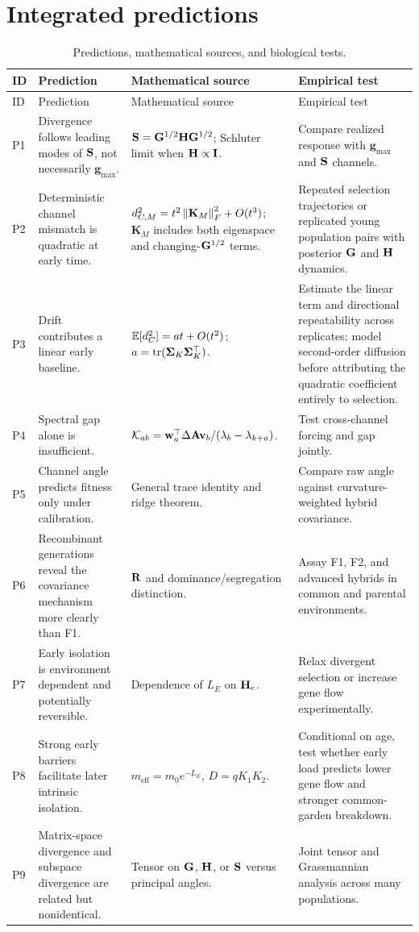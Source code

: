 \chapter{Integrated predictions}

\begin{longtable}{@{}p{}p{}p{}p{}@{}}
\caption{Predictions, mathematical sources, and biological tests.}\\
\toprule
ID & Prediction & Mathematical source & Empirical test \\
\midrule
\endfirsthead
\toprule
ID & Prediction & Mathematical source & Empirical test \\
\midrule
\endhead
P1 & Divergence follows leading modes of \(\mathbf{S}\), not necessarily \(\mathbf g_{\max}\). & \(\mathbf{S}=\mathbf{G}^{1/2}\mathbf{H}\mathbf{G}^{1/2}\); Schluter limit when \(\mathbf{H}\propto\mathbf{I}\). & Compare realized response with \(\mathbf g_{\max}\) and \(\mathbf{S}\) channels. \\
P2 & Deterministic channel mismatch is quadratic at early time. & \(d_{C,M}^2=t^2\left\lVert \mathbf K_M\right\rVert_F^2+O(t^3)\); \(\mathbf K_M\) includes both eigenspace and changing-\(\mathbf{G}^{1/2}\) terms. & Repeated selection trajectories or replicated young population pairs with posterior \(\mathbf{G}\) and \(\mathbf{H}\) dynamics. \\
P3 & Drift contributes a linear early baseline. & \(\mathbb E[d_C^2]=a t+O(t^2)\); \(a=\operatorname{tr}(\boldsymbol\Sigma_K\boldsymbol\Sigma_K^\top)\). & Estimate the linear term and directional repeatability across replicates; model second-order diffusion before attributing the quadratic coefficient entirely to selection. \\
P4 & Spectral gap alone is insufficient. & \(\mathcal K_{ab}=\mathbf w_a^\top\Delta\mathbf{A}\mathbf v_b/(\lambda_b-\lambda_{k+a})\). & Test cross-channel forcing and gap jointly. \\
P5 & Channel angle predicts fitness only under calibration. & General trace identity and ridge theorem. & Compare raw angle against curvature-weighted hybrid covariance. \\
P6 & Recombinant generations reveal the covariance mechanism more clearly than F1. & \(\mathbf{R}\) and dominance/segregation distinction. & Assay F1, F2, and advanced hybrids in common and parental environments. \\
P7 & Early isolation is environment dependent and potentially reversible. & Dependence of \(L_E\) on \(\mathbf{H}_e\). & Relax divergent selection or increase gene flow experimentally. \\
P8 & Strong early barriers facilitate later intrinsic isolation. & \(m_{\mathrm{eff}}=m_0e^{-L_E}\), \(D=qK_1K_2\). & Conditional on age, test whether early load predicts lower gene flow and stronger common-garden breakdown. \\
P9 & Matrix-space divergence and subspace divergence are related but nonidentical. & Tensor on \(\mathbf{G}\), \(\mathbf{H}\), or \(\mathbf{S}\) versus principal angles. & Joint tensor and Grassmannian analysis across many populations. \\
\bottomrule
\end{longtable}
